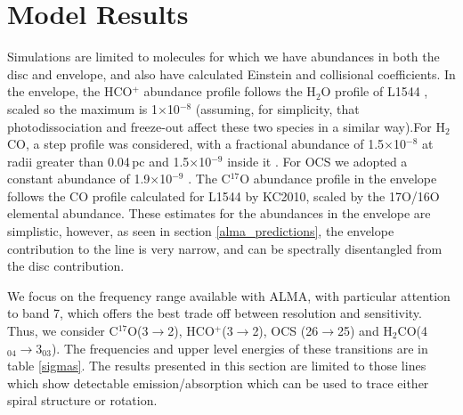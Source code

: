 \documentclass[useAMS,usenatbib]{mn2e}
\begin{document}
\section{Model Results} \label{sec:model_results}

Simulations are limited to molecules for which we have abundances in both the disc and envelope, and also have calculated Einstein and collisional coefficients. In the envelope, the HCO$^+$ abundance profile follows the H$_2$O profile of L1544 \citep{Caselli2012}, scaled so the maximum is 1$\times$10$^{-8}$ (assuming, for simplicity, that photodissociation and freeze-out affect these two species in a similar way).For H$_2$CO, a step profile was considered, with a fractional abundance of 1.5$\times$10$^{-8}$ at radii greater than 0.04$\,$pc and 1.5$\times$10$^{-9}$ inside it \citep{Young2004}. For OCS we adopted a constant abundance of 1.9$\times$10$^{-9}$ \citep{Ren2011}. The C$^{17}$O abundance profile in the envelope follows the CO profile calculated for L1544 by KC2010, scaled by the 17O/16O elemental abundance. These estimates for the abundances in the envelope are simplistic, however, as seen in section \ref{alma_predictions}, the envelope contribution to the line is very narrow, and can be spectrally disentangled from the disc contribution.\smallskip

We focus on the frequency range available with ALMA, with particular attention to band 7, which offers the best trade off between resolution and sensitivity. Thus, we consider C$^{17}$O(3$\rightarrow$2), HCO$^+$(3$\rightarrow$2), OCS (26$\rightarrow$25) and H$_2$CO(4$_{04}\rightarrow$3$_{03}$).  The frequencies and upper level energies of these transitions are in table \ref{sigmas}. The results presented in this section are limited to those lines which show detectable emission/absorption which can be used to trace either spiral structure or rotation.\smallskip

\end{document}
